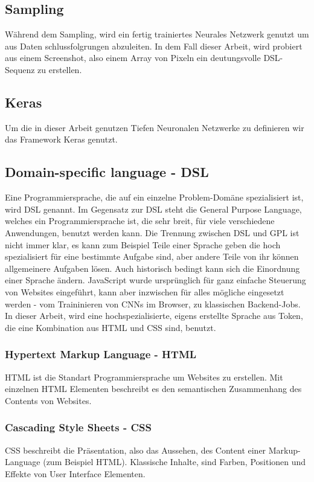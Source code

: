 \documentclass[pdftex,a4paper,halfparskip]{scrartcl}
\begin{document}
\subsection{Sampling}
Während dem Sampling, wird ein fertig trainiertes Neurales Netzwerk genutzt um aus Daten schlussfolgrungen abzuleiten. In dem Fall dieser Arbeit, wird probiert aus einem Screenshot, also einem Array von Pixeln ein deutungsvolle DSL-Sequenz zu erstellen.

\subsection{Keras}
Um die in dieser Arbeit genutzen Tiefen Neuronalen Netzwerke zu definieren wir das Framework Keras genutzt.

\subsection{Domain-specific language - DSL}

Eine Programmiersprache, die auf ein einzelne Problem-Domäne spezialisiert ist, wird DSL genannt. Im Gegensatz zur DSL steht die General Purpose Language, welches ein Programmiersprache ist, die sehr breit, für viele verschiedene Anwendungen, benutzt werden kann. Die Trennung zwischen DSL und GPL ist nicht immer klar, es kann zum Beispiel Teile einer Sprache geben die hoch spezialisiert für eine bestimmte Aufgabe sind, aber andere Teile von ihr können allgemeinere Aufgaben lösen. Auch historisch bedingt kann sich die Einordnung einer Sprache ändern. JavaScript wurde ursprünglich für ganz einfache Steuerung von Websites eingeführt, kann aber inzwischen für alles mögliche eingesetzt werden - vom Traininieren von CNNs im Browser, zu klassischen Backend-Jobs. 
In dieser Arbeit, wird eine hochspezialisierte, eigens erstellte Sprache aus Token, die eine Kombination aus HTML und CSS sind, benutzt.

\subsubsection{Hypertext Markup Language - HTML}
HTML ist die Standart Programmiersprache um Websites zu erstellen. Mit einzelnen HTML Elementen beschreibt es den semantischen Zusammenhang des Contents von Websites.

\subsubsection{Cascading Style Sheets - CSS}
CSS beschreibt die Präsentation, also das Aussehen, des Content einer Markup-Language (zum Beispiel HTML). Klassische Inhalte, sind Farben, Positionen und Effekte von User Interface Elementen.
 
\end{document}
